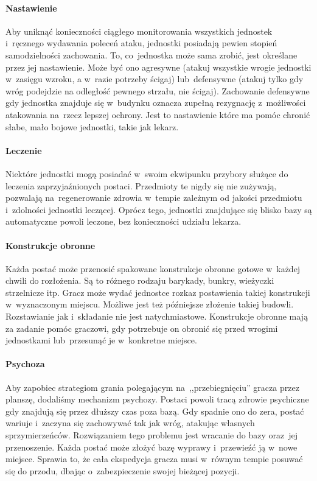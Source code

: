 \documentclass[licencjacka]{pracamgr}
\begin{document}
      \paragraph{Nastawienie}
	Aby uniknąć konieczności ciągłego monitorowania wszystkich jednostek i~ręcznego wydawania poleceń ataku, jednostki posiadają pewien
	stopień samodzielności zachowania. To, co~jednostka może sama zrobić, jest określane przez jej nastawienie. Może być ono agresywne
	(atakuj wszystkie wrogie jednostki w~zasięgu wzroku, a w~razie potrzeby ścigaj) lub~defensywne (atakuj tylko gdy wróg podejdzie na
	odległość pewnego strzału, nie ścigaj). Zachowanie defensywne gdy jednostka znajduje się w~budynku oznacza zupełną rezygnację
	z~możliwości atakowania na~rzecz lepszej ochrony. Jest to nastawienie które ma pomóc chronić słabe, mało bojowe jednostki, takie jak lekarz.
      \paragraph{Leczenie}
	Niektóre jednostki mogą posiadać w~swoim ekwipunku przybory służące do leczenia zaprzyjaźnionych postaci. Przedmioty te nigdy się nie zużywają,
	pozwalają na~regenerowanie zdrowia w~tempie zależnym od jakości przedmiotu i~zdolności jednostki leczącej. Oprócz tego, jednostki znajdujące się
	blisko bazy są automatyczne powoli leczone, bez konieczności udziału lekarza.
      \paragraph{Konstrukcje obronne}
	Każda postać może przenosić spakowane konstrukcje obronne gotowe w~każdej chwili do rozłożenia. Są to różnego rodzaju barykady, bunkry, wieżyczki
	strzelnicze itp. Gracz może wydać jednostce rozkaz postawienia takiej konstrukcji w~wyznaczonym miejscu. Możliwe jest też późniejsze złożenie takiej
	budowli. Rozstawianie jak i~składanie nie jest natychmiastowe. Konstrukcje obronne mają za zadanie pomóc graczowi,
	gdy potrzebuje on obronić się przed wrogimi jednostkami lub~przesunąć je w~konkretne miejsce.
      \paragraph{Psychoza}
	Aby zapobiec strategiom grania polegającym na~,,przebiegnięciu'' gracza przez planszę, dodaliśmy mechanizm psychozy. Postaci
	powoli tracą zdrowie psychiczne gdy znajdują się przez dłuższy czas poza bazą. Gdy spadnie ono do zera, postać wariuje
	i~zaczyna się zachowywać tak jak wróg, atakując własnych sprzymierzeńców. Rozwiązaniem tego problemu jest wracanie do bazy oraz~jej przenoszenie.
	Każda postać może złożyć bazę wyprawy i~przewieźć ją w~nowe miejsce. Sprawia to, że cała ekspedycja gracza musi w~równym tempie posuwać się
	do przodu, dbając o~zabezpieczenie swojej bieżącej pozycji.
\end{document}
